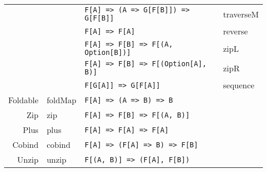\documentclass{tufte-handout}
\begin{document}
\begin{table}[ht]
\begin{tabular}{rlll}
                  &          & \texttt{F[A] => \hfill (A => G[F[B]]) => G[F[B]]} & traverseM \\
                  &          & \texttt{F[A] => \hfill F[A]} & reverse \\
                  &          & \texttt{F[A] => \hfill F[B] => F[(A, Option[B])]} & zipL \\
                  &          & \texttt{F[A] => \hfill F[B] => F[(Option[A], B)]} & zipR \\
                  &          & \texttt{F[G[A]] => \hfill G[F[A]]} & sequence \\[.5cm]
    Foldable      & foldMap & \texttt{F[A] => \hfill (A => B) => B} \\[.5cm]
    Zip           & zip & \texttt{F[A] => \hfill F[B] => F[(A, B)]} \\[.5cm]
    Plus          & plus & \texttt{F[A] => \hfill F[A] => F[A]} \\[.5cm]
    Cobind        & cobind & \texttt{F[A] => \hfill (F[A] => B) => F[B]} \\[.5cm]
    Unzip         & unzip & \texttt{F[(A, B)] => \hfill (F[A], F[B])} \\
  \end{tabular}
  \label{tab:normaltab}
\end{table}
\end{document}
